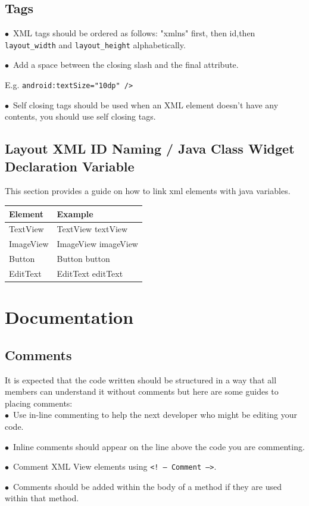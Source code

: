 \documentclass[english]{article}
\begin{document}
	\subsection{Tags}
$\bullet$\ XML tags should be ordered as follows: "xmlns" first, then id,then  \texttt{layout\_width} and  \texttt{layout\_height} alphabetically. \par
$\bullet$\ Add a space between the closing slash and the final attribute.\par E.g.  \texttt{android:textSize="10dp" /> }\par
$\bullet$\ Self closing tags should be used when an XML element doesn't have any contents, you should use self closing tags. \par

\subsection{Layout XML ID Naming / Java Class Widget Declaration Variable}
				
This section provides a guide on how to link xml elements with java variables.
				\\
				\begin{tabular}{ |p{3cm}|p{9cm}|  }
				\hline
				\textbf{Element} & \textbf{Example}  \\
				\hline
				TextView &	TextView textView\\
				\hline
				ImageView &	ImageView imageView\\
				\hline
				Button &	Button button\\
				\hline
				EditText &	EditText editText \\
				\hline
				\end{tabular}
\section{Documentation}

\subsection{Comments}
It is expected that the code written should be structured in a way that all members can understand it without comments but here are some guides to placing comments:\\
$\bullet$\ Use in-line commenting to help the next developer who might be editing your code.\par
$\bullet$\ Inline comments should appear on the line above the code you are commenting.\par
$\bullet$\ Comment XML View elements using  \texttt{<! -- Comment -->}.\par
$\bullet$\ Comments should be added within the body of a method if they are used within that method.\par
\end{document}
